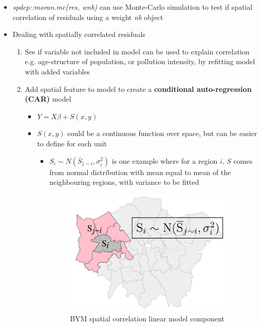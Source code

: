 \documentclass{article}
\begin{document}
\begin{itemize}
\begin{itemize}
        \item \textit{spdep::moran.mc(res, wnb)} can use Monte-Carlo simulation to test if spatial correlation of residuals using a weight \textit{nb} object
        \item Dealing with spatially correlated residuals
        \begin{enumerate}
            \item See if variable not included in model can be used to explain correlation e.g. age-structure of population, or pollution intensity, by refitting model with added variables
            \item Add spatial feature to model to create a \textbf{conditional auto-regression (CAR)} model
            \begin{itemize}
                \item $Y = X \beta + S(x, y)$
                \item $S(x, y)$ could be a continuous function over space, but can be easier to define for each unit
                \begin{itemize}
                    \item $S_i \sim N(\bar{S}_{j \sim i}, \sigma_i^2)$ is one example where for a region $i$, $S$ comes from normal distribution with  mean equal to mean of the neighbouring regions, with variance to be fitted
                    
                    \begin{figure}[h]
                        \centering
                        \caption{BYM spatial correlation linear model component}
                        \label{bym spatial correlation}
                        \includegraphics[width=8cm]{bym-spatial-correlation.png}
                    \end{figure}


\end{itemize}
\end{itemize}
\end{enumerate}
\end{itemize}
\end{itemize}
\end{document}
